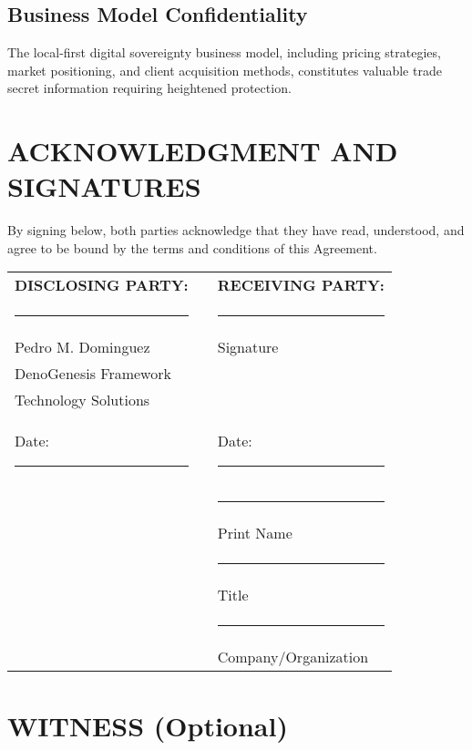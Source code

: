 \documentclass[11pt,letterpaper]{article}
\begin{document}
\subsection{Business Model Confidentiality}
The local-first digital sovereignty business model, including pricing strategies, market positioning, and client acquisition methods, constitutes valuable trade secret information requiring heightened protection.

\section{ACKNOWLEDGMENT AND SIGNATURES}

By signing below, both parties acknowledge that they have read, understood, and agree to be bound by the terms and conditions of this Agreement.

\vspace{1cm}

\begin{tabular}{p{7cm}p{1cm}p{7cm}}
\textbf{DISCLOSING PARTY:} & & \textbf{RECEIVING PARTY:} \\[1cm]

\rule{6cm}{0.4pt} & & \rule{6cm}{0.4pt} \\
Pedro M. Dominguez & & Signature \\
DenoGenesis Framework & & \\
Technology Solutions & & \\[0.5cm]

Date: \rule{3cm}{0.4pt} & & Date: \rule{3cm}{0.4pt} \\[1cm]

& & \rule{6cm}{0.4pt} \\
& & Print Name \\[0.5cm]

& & \rule{6cm}{0.4pt} \\
& & Title \\[0.5cm]

& & \rule{6cm}{0.4pt} \\
& & Company/Organization \\
\end{tabular}

\vspace{1cm}

\section{WITNESS (Optional)}
\end{document}
